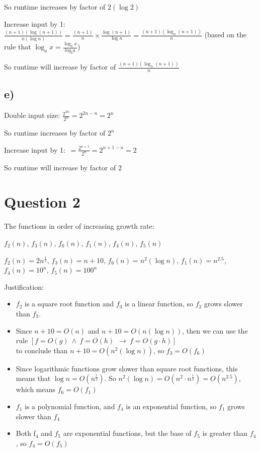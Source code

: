 \documentclass{article}
\begin{document}
So runtime increases by factor of $2 (\log 2)$

Increase input by 1: $\frac{(n+1)(\log (n+1))}{n (\log n)} = \frac{(n+1)}{n} \times \frac{\log(n+1)}{\log n} = \frac{(n+1)(\log_{n}(n+1))}{n}$ (based on the rule that $\log_{a}x = \frac{\log_{b}x}{log_{b}a}$)

So runtime will increase by factor of $\frac{(n+1)(\log_{n}(n+1))}{n}$

\subsection*{e)}
Double input size: $\frac{2^{2n}}{2^n} = 2^{2n-n} = 2^n$

So runtime increases by factor of $2^n$

Increase input by 1: $\frac{}{} = \frac{2^{n+1}}{2^n} = 2^{n+1-n} = 2$

So runtime will increase by factor of $2$



\section*{Question 2}

The functions in order of increasing growth rate:

$f_2(n)$, $f_3(n)$, $f_6(n)$, $f_1(n)$, $f_4(n)$, $f_5(n)$

$f_2(n) = 2n^{\frac{1}{2}}$, $f_3(n) = n+10$, $f_6(n) = n^2(\log n)$, $f_1(n) = n^{2.5}$,  $f_4(n) = 10^n$, $f_5(n) = 100^n$

Justification:
\begin{itemize}
    \item $f_2$ is a square root function and $f_3$ is a linear function, so $f_2$ grows slower than $f_3$.
    \item Since $n+10 = O(n)$ and $n+10 = O(n (\log n))$, then we can use the rule $[f = O(g) \ \land \ f = O(h) \ \ \rightarrow{} \ f = O(g \cdot h)]$ \\ to conclude than $n+10 = O(n^2(\log n))$, so $f_3 = O(f_6)$
    \item Since logarithmic functions grow slower than square root functions, this means that $\log n = O(n^{\frac{1}{2}})$. So $n^2(\log n) = O(n^2 \cdot n^{\frac{1}{2}}) = O(n^{2.5})$, which means $f_6 = O(f_1)$ 
    \item $f_1$ is a polynomial function, and $f_4$ is an exponential function, so $f_1$ grows slower than $f_4$
    \item Both f$_4$ and $f_5$ are exponential functions, but the base of $f_5$ is greater than $f_4$, so $f_4 = O(f_5)$
\end{itemize}
\end{document}
